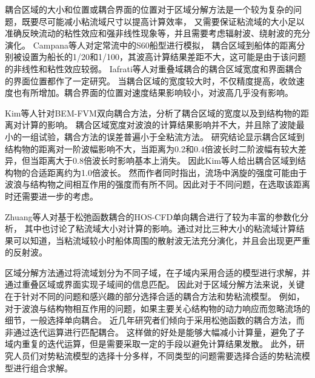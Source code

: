 耦合区域的大小和位置或耦合界面的位置对于区域分解方法是一个较为复杂的问题，既要尽可能减小粘流域尺寸以提高计算效率，%
又需要保证粘流域的大小足以准确反映流动的粘性效应和强非线性现象等，并且需要考虑辐射波、绕射波的充分演化。%
Campana等人\cite{campanaViscousinviscidCouplingFree1995}对定常流中的S60船型进行模拟，%
耦合区域到船体的距离分别被设置为船长的1/20和1/100，其波高计算结果差距不大，这可能是由于该问题的非线性和粘性效应较弱。%
Iafrati等人\cite{iafratiDomainDecompositionApproach2003}对重叠域耦合的耦合区域宽度和界面耦合的界面位置都作了一定研究。%
当耦合区域的宽度较大时，不仅精度提高，收敛速度也有所增加。耦合界面的位置对速度结果影响较小，对波高几乎没有影响。%

Kim等人\cite{kimSimpleTwowayCoupling2010}针对BEM-FVM双向耦合方法，分析了耦合区域的宽度以及到结构物的距离对计算的影响。%
耦合区域宽度对波浪的计算结果影响并不大，并且除了波陡最小的一组试验，耦合方法的误差普遍小于全粘流方法。%
研究结论显示耦合区域到结构物的距离对一阶波幅影响不大，当距离为0.2和0.4倍波长时二阶波幅有较大差异，但当距离大于0.8倍波长时影响基本上消失。%
因此Kim等人\cite{kimSimpleTwowayCoupling2010}给出耦合区域到结构物的合适距离约为1.0倍波长。%
然而作者同时指出，流场中涡旋的强度可能由于波浪与结构物之间相互作用的强度而有所不同。因此对于不同问题，在选取该距离时还需要进一步的考虑。%

Zhuang等人\cite{zhuangParametricStudyNew2021}对基于松弛函数耦合的HOS-CFD单向耦合进行了较为丰富的参数化分析，%
其中也讨论了粘流域大小对计算的影响。通过对比三种大小的粘流域计算结果可以知道，当粘流域较小时船体周围的散射波无法充分演化，并且会出现更严重的反射波。%

区域分解方法通过将流域划分为不同子域，在子域内采用合适的模型进行求解，并通过重叠区域或界面实现子域间的信息匹配。%
因此对于区域分解方法来说，关键在于针对不同的问题和感兴趣的部分选择合适的耦合方法和势粘流模型。%
例如，对于波浪与结构物相互作用的问题，如果主要关心结构物的动力响应而忽略流场的细节，一般选择单向耦合。%
近几年研究者们倾向于采用松弛函数的耦合方法，而非通过迭代运算进行匹配耦合。%
这样做的好处是能够大幅减小计算量，避免了子域内重复的迭代运算，但是需要采取一定的手段以避免计算结果发散。%
此外，研究人员们对势粘流模型的选择十分多样，不同类型的问题需要选择合适的势粘流模型进行组合求解。

